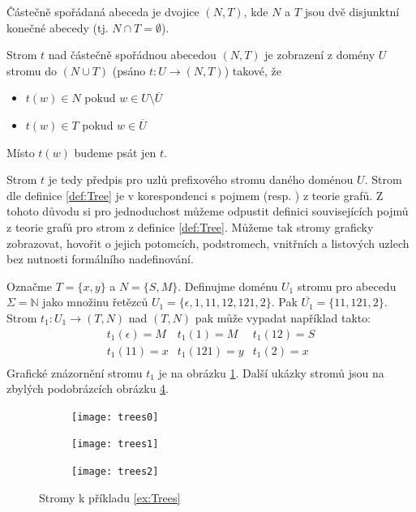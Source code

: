 \documentclass[a4paper,10pt]{article}
\begin{document}
\begin{definition}
  Částečně spořádaná abeceda je dvojice $(N, T)$, kde $N$ a $T$ jsou dvě disjunktní konečné abecedy (tj. $N \cap T = \emptyset$).
\end{definition}

\begin{definition}[Strom] \label{def:Tree}
 Strom $t$ nad částečně spořádnou abecedou $(N, T)$ je zobrazení z domény $U$ stromu do $(N \cup T) $ (psáno $t: U \rightarrow (N, T)$) takové, že
 \begin{itemize}
  \item $t(w) \in N$ pokud $w \in U \setminus \overline{U}$
  \item $t(w) \in T$ pokud $w \in \overline{U}$
 \end{itemize}
 Místo $t(w)$ budeme psát jen $t$.
\end{definition}
Strom $t$ je tedy předpis pro  uzlů prefixového stromu daného doménou $U$. Strom dle definice \ref{def:Tree} je v korespondenci s pojmem  (resp. ) z teorie grafů. Z tohoto důvodu si pro jednoduchost můžeme odpustit definici souvisejících pojmů z teorie grafů pro strom z definice \ref{def:Tree}. Můžeme tak stromy graficky zobrazovat, hovořit o jejich potomcích, podstromech, vnitřních a listových uzlech bez nutnosti formálního nadefinování.

\begin{example} \label{ex:Trees}
 Označme $T = \{ x, y \}$ a $N = \{ S, M \}$. Definujme doménu $U_1$ stromu pro abecedu $\Sigma = \mathbb{N}$ jako množinu řetězců $U_1 = \{ \epsilon, 1, 11, 12, 121, 2 \}$. Pak $\overline{U_1} = \{ 11, 121, 2 \}$. Strom $t_1: U_1 \rightarrow (T, N)$ nad $(T, N)$ pak může vypadat například takto:
 $$
 \begin{array}{lll}
   t_1(\epsilon) = M	& t_1(1) = M	& t_1(12) = S \\
   t_1(11) = x		& t_1(121) = y	& t_1(2) = x \\
  \end{array}
 $$
 Grafické znázornění stromu $t_1$ je na obrázku \ref{img:Tree:first}. Další ukázky stromů jsou na zbylých podobrázcích obrázku \ref{img:Tree}.  
\end{example}

\begin{figure}
  \begin{subfigure}[t]{0.3\textwidth} \centering
   \texttt{[image: trees0]}
   \caption{} \label{img:Tree:first}
  \end{subfigure}
%  
  \begin{subfigure}[t]{0.3\textwidth} \centering
   \texttt{[image: trees1]}
   \caption{} \label{img:Tree:second}
  \end{subfigure}
%  
  \begin{subfigure}[t]{0.3\textwidth} \centering
   \texttt{[image: trees2]}
   \caption{} \label{img:Tree:third}
  \end{subfigure}
  
 \caption{Stromy k příkladu \ref{ex:Trees}} \label{img:Tree}
\end{figure}
\end{document}
